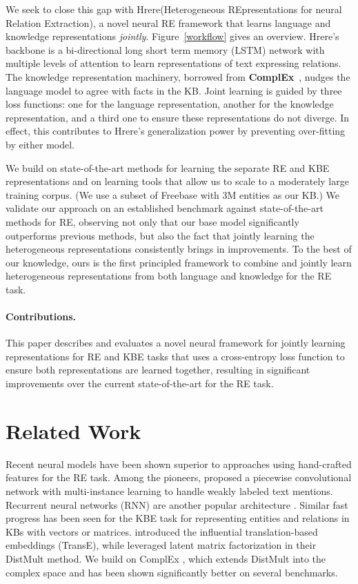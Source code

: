 \documentclass[11pt,a4paper]{article}
\def\HRERE{{\sc Hrere}\xspace}
\begin{document}
We seek to close this gap with \HRERE (Heterogeneous REpresentations for neural Relation Extraction), a novel neural RE framework that learns language and knowledge representations \emph{jointly}.
Figure~\ref{workflow} gives an overview.
\HRERE's backbone is a bi-directional long short term memory (LSTM) network with multiple levels of attention to learn representations of text expressing relations. 
The knowledge representation machinery, borrowed from {\bf ComplEx}~\cite{trouillon2016complex}, nudges the language model to agree with facts in the KB.
Joint learning is guided by three loss functions: one for the language representation, another for the knowledge representation, and a third one to ensure these representations do not diverge.
In effect, this contributes to \HRERE's generalization power by preventing over-fitting by either model.

We build on state-of-the-art methods for learning the separate RE and KBE representations and on learning tools that allow us to scale to a moderately large training corpus. (We use a subset of Freebase with 3M entities as our KB.)
We validate our approach on an established benchmark against state-of-the-art methods for RE, observing not only that our base model significantly outperforms previous methods, but also the fact that jointly learning the heterogeneous representations consistently brings in improvements.
To the best of our knowledge, ours is the first principled framework to combine and jointly learn heterogeneous representations from both language and knowledge for the RE task.

\paragraph*{Contributions.}
This paper describes and evaluates a novel neural framework for jointly learning representations for RE and KBE tasks that uses a cross-entropy loss function to ensure both representations are learned together, resulting in significant improvements over the current state-of-the-art for the RE task. 
\section{Related Work}




Recent neural models have been shown superior to approaches using hand-crafted features for the RE task.
Among the pioneers,  proposed a piecewise convolutional network with multi-instance learning to handle weakly labeled text mentions.
Recurrent neural networks (RNN) are another popular architecture \cite{wu2017adversarial}. 
Similar fast progress has been seen for the KBE task for representing entities and relations in KBs with vectors or matrices.
\citet{bordes2013translating} introduced the influential translation-based embeddings (TransE), while
\citet{yang2014embedding} leveraged latent matrix factorization in their DistMult method.
We build on ComplEx \cite{trouillon2016complex}, which extends DistMult into the complex space and has been shown significantly better on several benchmarks.
\end{document}

